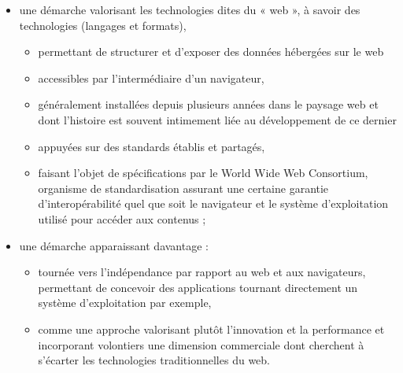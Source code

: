 \begin{itemize}[label=\textbullet] %
    \item une démarche valorisant les technologies dites du « web », à savoir des technologies (langages et formats), 
    \begin{itemize}[label=--] %
        \item permettant de structurer et d’exposer des données hébergées sur le web 
        \item accessibles par l’intermédiaire d’un navigateur,
        \item généralement installées depuis plusieurs années dans le paysage web et dont l’histoire est souvent intimement liée au développement de ce dernier 
        \item appuyées sur des standards établis et partagés, 
        \item faisant l’objet de spécifications par le World Wide Web Consortium, organisme de standardisation assurant une certaine garantie d’interopérabilité quel que soit le navigateur et le système d’exploitation utilisé pour accéder aux contenus ; 
    \end{itemize}
    \item une démarche apparaissant davantage : 
    \begin{itemize}[label=--]
            \item tournée vers l’indépendance par rapport au web et aux navigateurs, permettant de concevoir des applications tournant directement un système d’exploitation par exemple,
            \item comme une approche valorisant plutôt l’innovation et la performance et incorporant volontiers une dimension commerciale dont cherchent à s’écarter les technologies traditionnelles du web. 
    \end{itemize}
\end{itemize}

